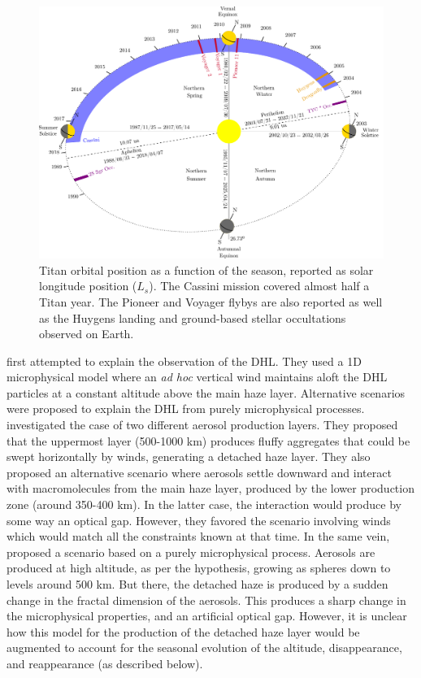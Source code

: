 \begin{figure}[!ht]
    \centering
    \includegraphics[width=\textwidth]{Fig/Titan_seasons}
    \caption{Titan orbital position as a function of the season, reported as solar longitude position ($L_s$).
             The Cassini mission covered almost half a Titan year. The Pioneer and Voyager flybys are also reported
             as well as the Huygens landing and ground-based stellar occultations observed on Earth.}
    \label{fig:titan_seasons}
\end{figure}

 \cite{Toon1992} first attempted to explain the observation of the DHL. They used a 1D microphysical
model where an \emph{ad hoc} vertical wind maintains aloft the DHL particles at a constant altitude above the main
haze layer. Alternative scenarios were proposed to explain the DHL from purely microphysical processes. \cite{Chassefiere1995}
investigated the case of two different aerosol production layers. They proposed that the uppermost layer (500-1000 km)
produces fluffy aggregates that could be swept horizontally by winds, generating a detached haze layer. They also
proposed an alternative scenario where aerosols settle downward and interact with macromolecules from the main haze layer,
produced by the lower production zone (around 350-400 km). In the latter case, the interaction would produce by some
way an optical gap. However, they favored the scenario involving winds which would match all the constraints
known at that time. In the same vein, \cite{Lavvas2009} proposed a scenario based on a purely microphysical process. Aerosols
are produced at high altitude, as per the \cite{Chassefiere1995} hypothesis, growing as spheres down to levels around 500 km.
But there, the detached haze is produced by a sudden change in the fractal dimension of the aerosols. This produces a
sharp change in the microphysical properties, and an artificial optical gap. However, it is unclear how this model for the
production of the detached haze layer would be augmented to account for the seasonal evolution of the altitude,
disappearance, and reappearance (as described below).

